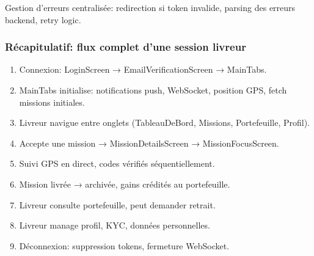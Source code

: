Gestion d'erreurs centralisée: redirection si token invalide, parsing des erreurs backend, retry logic.

\subsubsection{Récapitulatif: flux complet d'une session livreur}

\begin{enumerate}
    \item Connexion: LoginScreen → EmailVerificationScreen → MainTabs.
    \item MainTabs initialise: notifications push, WebSocket, position GPS, fetch missions initiales.
    \item Livreur navigue entre onglets (TableauDeBord, Missions, Portefeuille, Profil).
    \item Accepte une mission → MissionDetailsScreen → MissionFocusScreen.
    \item Suivi GPS en direct, codes vérifiés séquentiellement.
    \item Mission livrée → archivée, gains crédités au portefeuille.
    \item Livreur consulte portefeuille, peut demander retrait.
    \item Livreur manage profil, KYC, données personnelles.
    \item Déconnexion: suppression tokens, fermeture WebSocket.
\end{enumerate}

